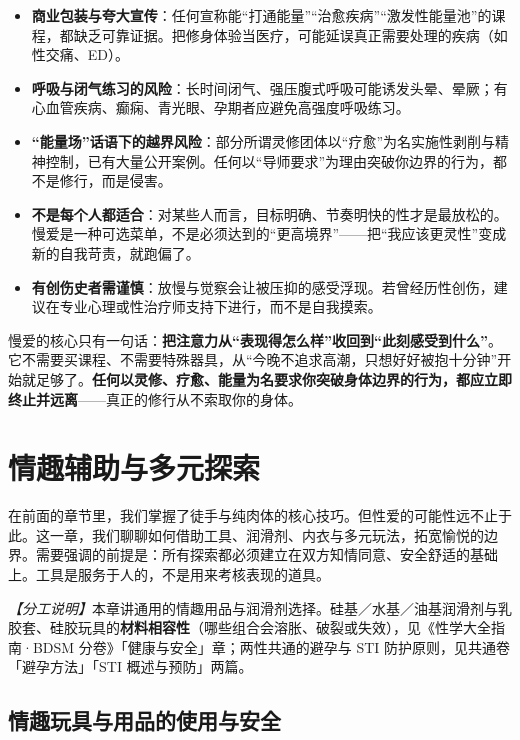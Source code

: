 \documentclass[12pt,UTF8]{ctexbook}
\begin{document}
\begin{itemize}
\item \textbf{商业包装与夸大宣传}：任何宣称能“打通能量”“治愈疾病”“激发性能量池”的课程，都缺乏可靠证据。把修身体验当医疗，可能延误真正需要处理的疾病（如性交痛、ED）。
\item \textbf{呼吸与闭气练习的风险}：长时间闭气、强压腹式呼吸可能诱发头晕、晕厥；有心血管疾病、癫痫、青光眼、孕期者应避免高强度呼吸练习。
\item \textbf{“能量场”话语下的越界风险}：部分所谓灵修团体以“疗愈”为名实施性剥削与精神控制，已有大量公开案例。任何以“导师要求”为理由突破你边界的行为，都不是修行，而是侵害。
\item \textbf{不是每个人都适合}：对某些人而言，目标明确、节奏明快的性才是最放松的。慢爱是一种可选菜单，不是必须达到的“更高境界”——把“我应该更灵性”变成新的自我苛责，就跑偏了。
\item \textbf{有创伤史者需谨慎}：放慢与觉察会让被压抑的感受浮现。若曾经历性创伤，建议在专业心理或性治疗师支持下进行，而不是自我摸索。
\end{itemize}

\begin{tcolorbox}[colback=pink!5!white,colframe=red!50!black,title=贴心小叮咛]
慢爱的核心只有一句话：\textbf{把注意力从“表现得怎么样”收回到“此刻感受到什么”}。它不需要买课程、不需要特殊器具，从“今晚不追求高潮，只想好好被抱十分钟”开始就足够了。\textbf{任何以灵修、疗愈、能量为名要求你突破身体边界的行为，都应立即终止并远离}——真正的修行从不索取你的身体。
\end{tcolorbox}

\chapter{情趣辅助与多元探索}

在前面的章节里，我们掌握了徒手与纯肉体的核心技巧。但性爱的可能性远不止于此。这一章，我们聊聊如何借助工具、润滑剂、内衣与多元玩法，拓宽愉悦的边界。需要强调的前提是：所有探索都必须建立在双方知情同意、安全舒适的基础上。工具是服务于人的，不是用来考核表现的道具。

\noindent\textit{【分工说明】}本章讲通用的情趣用品与润滑剂选择。硅基／水基／油基润滑剂与乳胶套、硅胶玩具的\textbf{材料相容性}（哪些组合会溶胀、破裂或失效），见《性学大全指南·BDSM 分卷》「健康与安全」章；两性共通的避孕与 STI 防护原则，见共通卷「避孕方法」「STI 概述与预防」两篇。

\section{情趣玩具与用品的使用与安全}
\end{document}

